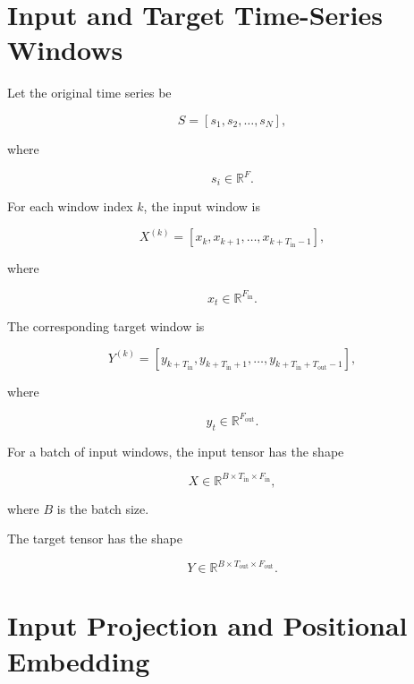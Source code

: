 \documentclass[a4paper]{article}
\begin{document}
    \section{Input and Target Time-Series Windows}
        
        Let the original time series be
        
        \[
            S
            =
            \left[
                s_1,
                s_2,
                \ldots,
            s_N
            \right],
        \]
        
        where
        
        \[
            s_i
            \in
            \mathbb{R}^{F}.
        \]
        
        For each window index \(k\), the input window is
        
        \[
            X^{(k)}
            =
            \left[
                x_k,
                x_{k+1},
                \ldots,
            x_{k+T_{\mathrm{in}}-1}
            \right],
        \]
        
        where
        
        \[
            x_t
            \in
            \mathbb{R}^{F_{\mathrm{in}}}.
        \]
        
        The corresponding target window is
        
        \[
            Y^{(k)}
            =
            \left[
                y_{k+T_{\mathrm{in}}},
            y_{k+T_{\mathrm{in}}+1},
                \ldots,
            y_{k+T_{\mathrm{in}}+T_{\mathrm{out}}-1}
            \right],
        \]
        
        where
        
        \[
            y_t
            \in
            \mathbb{R}^{F_{\mathrm{out}}}.
        \]
        
        For a batch of input windows, the input tensor has the shape
        
        \[
            X
            \in
            \mathbb{R}^{B \times T_{\mathrm{in}} \times F_{\mathrm{in}}},
        \]
        
        where \(B\) is the batch size.
        
        The target tensor has the shape
        
        \[
            Y
            \in
            \mathbb{R}^{B \times T_{\mathrm{out}} \times F_{\mathrm{out}}}.
        \]
    
    
    \section{Input Projection and Positional Embedding}
        
\end{document}
